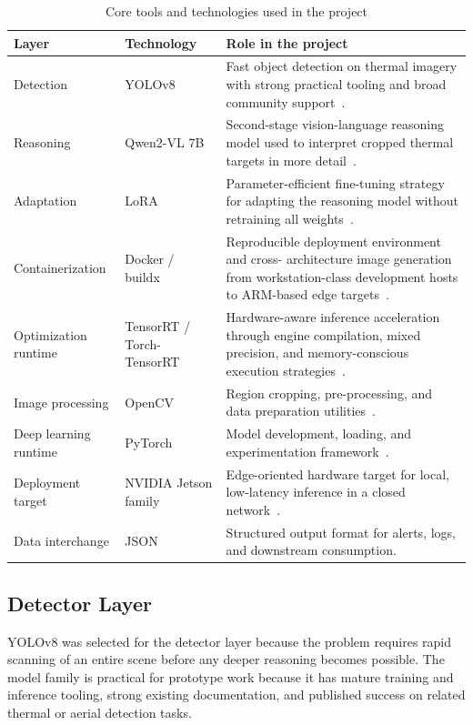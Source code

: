 \begin{table}[H]
  \centering
  \caption{Core tools and technologies used in the project}
  \begin{tabularx}{\textwidth}{@{}p{2.8cm}p{2.8cm}X@{}}
    \toprule
    Layer & Technology & Role in the project \\
    \midrule
    Detection & YOLOv8 & Fast object detection on thermal imagery with strong practical
    tooling and broad community support~\cite{yolov8}. \\
    Reasoning & Qwen2-VL 7B & Second-stage vision-language reasoning model used to
    interpret cropped thermal targets in more detail~\cite{qwen2vl}. \\
    Adaptation & LoRA & Parameter-efficient fine-tuning strategy for adapting the reasoning
    model without retraining all weights~\cite{lora}. \\
    Containerization & Docker / buildx & Reproducible deployment environment and cross-
    architecture image generation from workstation-class development hosts to ARM-based edge
    targets~\cite{dockerdocs}. \\
    Optimization runtime & TensorRT / Torch-TensorRT & Hardware-aware inference
    acceleration through engine compilation, mixed precision, and memory-conscious execution
    strategies~\cite{tensorrt,torchtrt}. \\
    Image processing & OpenCV & Region cropping, pre-processing, and data preparation
    utilities~\cite{opencv}. \\
    Deep learning runtime & PyTorch & Model development, loading, and experimentation
    framework~\cite{pytorch}. \\
    Deployment target & NVIDIA Jetson family & Edge-oriented hardware target for local,
    low-latency inference in a closed network~\cite{jetson}. \\
    Data interchange & JSON & Structured output format for alerts, logs, and downstream
    consumption. \\
    \bottomrule
  \end{tabularx}
\end{table}

\subsection{Detector Layer}

YOLOv8 was selected for the detector layer because the problem requires rapid scanning of an
entire scene before any deeper reasoning becomes possible. The model family is practical for
prototype work because it has mature training and inference tooling, strong existing
documentation, and published success on related thermal or aerial detection tasks.

